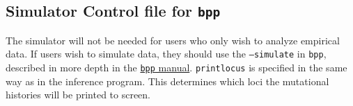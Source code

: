 \documentclass[11pt]{article}
\begin{document}
\subsection{Simulator Control file for \texttt{bpp}} 
The simulator will not be needed for users who only wish to analyze empirical data. If users wish to simulate data, they should use the \texttt{--simulate} in \texttt{bpp}, described in more depth in the \href{https://bpp.github.io/bpp-manual/}{\texttt{bpp} manual}. 
\texttt{printlocus} is specified in the same way as in the inference program. 
This determines which loci the mutational histories will be printed to screen. 

\end{document}
